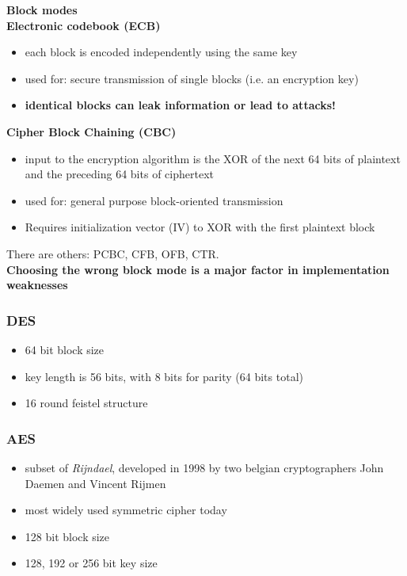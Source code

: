 \documentclass{article}
\begin{document}
\textbf{Block modes}
\\\textbf{Electronic codebook (ECB)}
\begin{itemize}
    \item each block is encoded independently using the same key
    \item used for: secure transmission of single blocks (i.e. an encryption key)
    \item \textbf{identical blocks can leak information or lead to attacks!}
\end{itemize}
\textbf{Cipher Block Chaining (CBC)}
\begin{itemize}
    \item input to the encryption algorithm is the XOR of the next 64 bits of plaintext and the preceding 64 bits of ciphertext
    \item used for: general purpose block-oriented transmission
    \item Requires initialization vector (IV) to XOR with the first plaintext block
\end{itemize}
There are others: PCBC, CFB, OFB, CTR.
\\\textbf{Choosing the wrong block mode is a major factor in implementation weaknesses}
\subsubsection{DES}
\begin{itemize}
    \item 64 bit block size
    \item key length is 56 bits, with 8 bits for parity (64 bits total)
    \item 16 round feistel structure
\end{itemize}
\subsubsection{AES}
\begin{itemize}
    \item subset of \textit{Rijndael}, developed in 1998 by two belgian cryptographers John Daemen and Vincent Rijmen
    \item most widely used symmetric cipher today
    \item 128 bit block size
    \item 128, 192 or 256 bit key size
\end{itemize}
\end{document}
